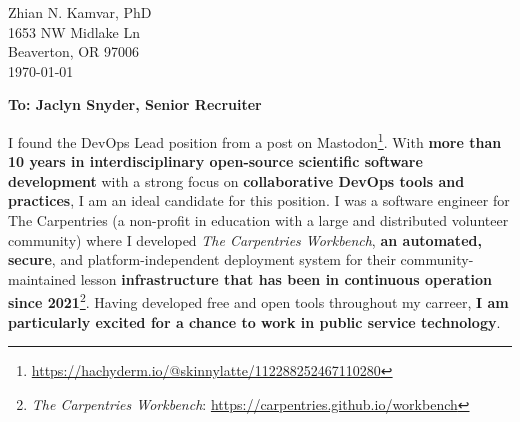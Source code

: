 


\clearpage
\begin{flushright}
  Zhian N. Kamvar, PhD\\
  1653 NW Midlake Ln\\
  Beaverton, OR 97006\\
  \today
\end{flushright}

\textbf{To: Jaclyn Snyder, Senior Recruiter}\\

\vspace{2ex}


I found the DevOps Lead position from a post on Mastodon\footnote{\url{https://hachyderm.io/@skinnylatte/112288252467110280}}. 
With \textbf{more than 10 years in interdisciplinary open-source scientific software development} %
with a strong focus on \textbf{collaborative DevOps tools and practices}, %
I am an ideal candidate for this position. 
I was a software engineer for The Carpentries (a non-profit in education with a large and distributed volunteer community) where I developed \textit{The Carpentries Workbench}, \textbf{an automated, secure}, and platform-independent deployment system for their community-maintained lesson \textbf{infrastructure that has been in continuous operation since 2021}\footnote{\textit{The Carpentries Workbench}: \url{https://carpentries.github.io/workbench}}.%
Having developed free and open tools throughout my carreer, \textbf{I am particularly excited for a chance to work in public service technology}. 


